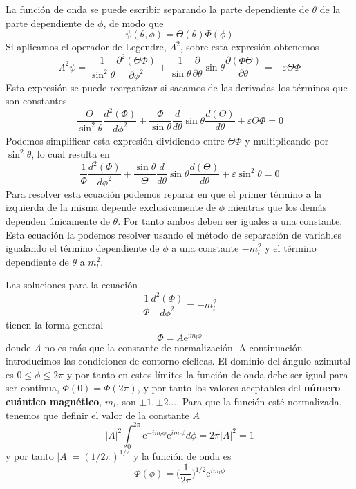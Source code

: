 La función de onda se puede escribir separando la parte
dependiente de $\theta$ de la parte dependiente de $\phi$,
de modo que
\begin{equation}
    \psi(\theta, \phi)=\Theta(\theta)\Phi(\phi)
\end{equation}
Si aplicamos el operador de Legendre, $\Lambda^2$, sobre
esta expresión obtenemos
\begin{equation}
    \Lambda^2\psi=\frac{1}{\sin^2\theta}\frac{\partial^2(\Theta\Phi)}{\partial\phi^2}+
    \frac{1}{\sin\theta}\frac{\partial}{\partial\theta}\sin\theta\frac{\partial(\Phi\Theta)}{\partial\theta}=-\varepsilon\Theta\Phi
\end{equation}
Esta expresión se puede reorganizar si sacamos de las 
derivadas los términos que son constantes 
\begin{equation}
    \frac{\Theta}{\sin^2\theta}\frac{d^2(\Phi)}{d\phi^2} + 
    \frac{\Phi}{\sin\theta}\frac{d}{d\theta}\sin\theta\frac{d(\Theta)}{d\theta}+
    \varepsilon\Theta\Phi=0
\end{equation}
Podemos simplificar esta expresión dividiendo entre $\Theta\Phi$ y 
multiplicando por $\sin^2\theta$, lo cual resulta en
\begin{equation}
    \frac{1}{\Phi}\frac{d^2(\Phi)}{d\phi^2} + 
    \frac{\sin\theta}{\Theta}\frac{d}{d\theta}\sin\theta\frac{d(\Theta)}{d\theta}+
    \varepsilon\sin^2\theta=0\label{eq:rotor}
\end{equation}
Para resolver esta ecuación podemos reparar en que el
primer término a la izquierda de la misma depende 
exclusivamente de $\phi$ mientras que los demás 
dependen únicamente de $\theta$. Por tanto ambos deben
ser iguales a una constante. Esta ecuación la podemos
resolver usando el método de separación de variables
igualando el término dependiente de $\phi$ a una constante
$-m^2_l$ y el término dependiente de $\theta$ a $m^2_l$.

Las soluciones para la ecuación 
\begin{equation}
    \frac{1}{\Phi}\frac{d^2(\Phi)}{d\phi^2}=-m^2_l
\end{equation}
tienen la forma general
\begin{equation}
    \Phi=A\mathrm{e}^{\mathrm{i}m_l\phi}
\end{equation}
donde $A$ no es más que la constante de normalización. A 
continuación introducimos las condiciones de contorno cíclicas.
El dominio del ángulo azimutal es $0\leq \phi\leq2\pi$
y por tanto en estos límites la función de onda debe ser
igual para ser continua, $\Phi(0)=\Phi(2\pi)$, y por tanto
los valores aceptables del \textbf{número cuántico magnético},
$m_l$, son $\pm 1,\pm 2...$. Para que la función esté
normalizada, tenemos que definir el valor de
la constante $A$
\begin{equation}
    |A|^2\int_0^{2\pi}\mathrm{e}^{-im_l\phi}\mathrm{e}^{im_l\phi}d\phi=
    2\pi|A|^2=1
\end{equation}
y por tanto $|A|=(1/2\pi)^{1/2}$ y la función de onda es
\begin{equation}
    \Phi(\phi)=\bigg(\frac{1}{2\pi}\bigg)^{1/2}\mathrm{e}^{im_l\phi}
\end{equation}

